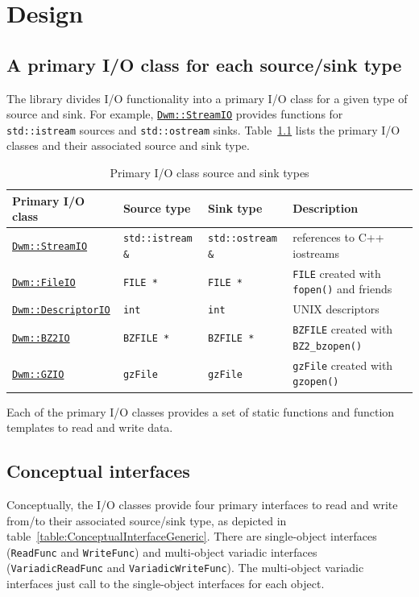 \chapter{Design}

\section{A primary I/O class for each source/sink type}
The library divides I/O functionality into a primary I/O class
for a given type of source and sink.  For example,
\hyperref[section:DwmStreamIOClass]{\texttt{Dwm::StreamIO}} provides
functions for \texttt{std::istream} sources and \texttt{std::ostream}
sinks.  Table~\ref{table:PrimaryClassSourceSinkType} lists the primary
I/O classes and their associated source and sink type.

\begin{table}[H]
\begin{tabular}{llll}
  \textbf{Primary I/O class} & \textbf{Source type} & \textbf{Sink type} & \textbf{Description} \\ \hline
  \hyperref[section:DwmStreamIOClass]{\texttt{Dwm::StreamIO}} & \texttt{std::istream \&} & \texttt{std::ostream \&} & references to C++ iostreams \\
  \hyperref[section:DwmFileIOClass]{\texttt{Dwm::FileIO}} & \texttt{FILE *} & \texttt{FILE *} & \texttt{FILE} created with \texttt{fopen()} and friends \\
  \hyperref[section:DwmDescriptorIOClass]{\texttt{Dwm::DescriptorIO}} & \texttt{int} & \texttt{int} & UNIX descriptors \\
  \hyperref[section:DwmBZ2IOClass]{\texttt{Dwm::BZ2IO}} & \texttt{BZFILE *} & \texttt{BZFILE *} & \texttt{BZFILE} created with \texttt{BZ2\_bzopen()}\\
  \hyperref[section:DwmGZIOClass]{\texttt{Dwm::GZIO}} & \texttt{gzFile} & \texttt{gzFile} & \texttt{gzFile} created with \texttt{gzopen()} \\
\end{tabular}
\caption{Primary I/O class source and sink types}
\label{table:PrimaryClassSourceSinkType}
\end{table}

Each of the primary I/O classes provides a set of static functions and
function templates to read and write data.

\section{Conceptual interfaces}
Conceptually, the I/O classes provide four primary interfaces to read
and write from/to their associated source/sink type, as depicted in
table~\ref{table:ConceptualInterfaceGeneric}.  There are
single-object interfaces (\texttt{ReadFunc} and \texttt{WriteFunc})
and multi-object variadic interfaces (\texttt{VariadicReadFunc} and
\texttt{VariadicWriteFunc}).  The multi-object variadic interfaces
just call to the single-object interfaces for each object.

